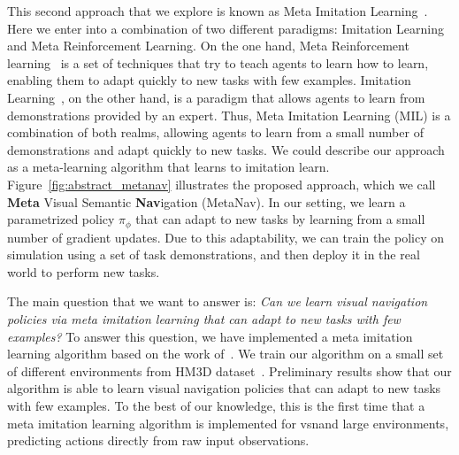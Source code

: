 This second approach that we explore is known as Meta Imitation Learning~\cite{finnOneShotVisualImitation2017}.
Here we enter into a combination of two different paradigms: Imitation Learning and Meta Reinforcement Learning.
On the one hand, Meta Reinforcement learning~\cite{Beck_2025} is a set of techniques that try to teach agents to learn how to learn, enabling them to adapt quickly to new tasks with few examples.
Imitation Learning~\cite{10602544}, on the other hand, is a paradigm that allows agents to learn from demonstrations provided by an expert.
Thus, Meta Imitation Learning (MIL) is a combination of both realms, allowing agents to learn from a small number of demonstrations and adapt quickly to new tasks.
We could describe our approach as a meta-learning algorithm that learns to imitation learn.
Figure~\ref{fig:abstract_metanav} illustrates the proposed approach, which we call \textbf{Meta} Visual Semantic \textbf{Nav}igation (MetaNav).
In our setting, we learn a parametrized policy $\pi_\phi$ that can adapt to new tasks by learning from a small number of gradient updates.
Due to this adaptability, we can train the policy on simulation using a set of task demonstrations, and then deploy it in the real world to perform new tasks.

The main question that we want to answer is: \textit{Can we learn visual navigation policies via meta imitation learning that can adapt to new tasks with few examples?}
To answer this question, we have implemented a meta imitation learning algorithm based on the work of~\cite{finnOneShotVisualImitation2017}.
We train our algorithm on a small set of different environments from HM3D dataset~\cite{Ramakrishnan2021HabitatMatterport3D}.
Preliminary results show that our algorithm is able to learn visual navigation policies that can adapt to new tasks with few examples.
To the best of our knowledge, this is the first time that a meta imitation learning algorithm is implemented for \acrshort{vsn}\@ and large environments, predicting actions directly from raw input observations.

